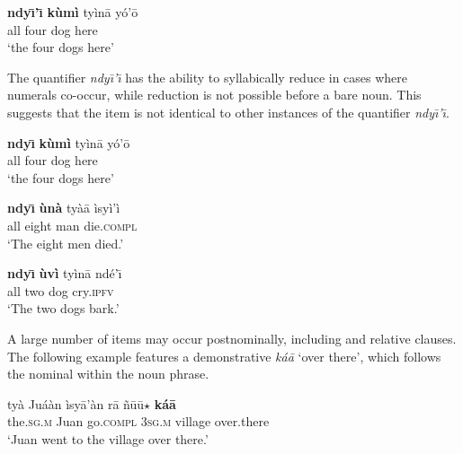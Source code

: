 \documentclass[output=paper,modfonts,nonflat]{langsci/langscibook}
\begin{document}
\ea {}\label{ex:cisneros:37}
\gll
\textbf{ndy\=\i'\=\i} \textbf{k\`um\`i} ty\`in\=a y\'o'\=o\\
all four dog here\\
\glt
`the four dogs here'
\z 

\z 

The quantifier \textit{ndy\=\i'\=\i} has the ability to syllabically reduce in cases where numerals co-occur, while reduction is not possible before a bare noun.  This suggests that the item is not identical to other instances of the quantifier \textit{ndy\=\i'\=\i}.

\ea {}\label{ex:cisneros:39}
\gll
\textbf{ndy\=\i} \textbf{k\`um\`i} ty\`in\=a y\'o'\=o\\
all four dog here\\
\glt
`the four dogs here'
\z 

\ea {}\label{ex:cisneros:40}
\gll
{\ob}\textbf{ndy\=\i} \textbf{\`un\`a} ty\`a\=a{\cb} \`isy\`i'\`i\\
{\db}all eight man die.\textsc{compl}\\
\glt
`The eight men died.'
\z 

\ea {}\label{ex:cisneros:41}
\gll
{\ob}\textbf{ndy\=\i} \textbf{\`uv\`i} ty\`in\=a{\cb} nd\'e'\=\i\\
{\db}all two dog cry.\textsc{ipfv}\\
\glt
`The two dogs bark.'
\z 

\z 

A large number of items may occur postnominally, including  and relative clauses.  The following example features a demonstrative \textit{k\'a\=a} `over there', which follows the nominal within the noun phrase.

\ea {}\label{ex:cisneros:43}
\gll
{\ob}ty\`a Ju\'a\`an{\cb} \`isy\=a'\`an r\=a {\ob}\~n\=u\=u$\star$ \textbf{k\'a\=a}{\cb}\\
{\db}the.\textsc{sg.m} Juan go.\textsc{compl} 3\textsc{sg.m} {\db}village over.there\\
\glt
`Juan went to the village over there.'
\z 
{}
\end{document}
